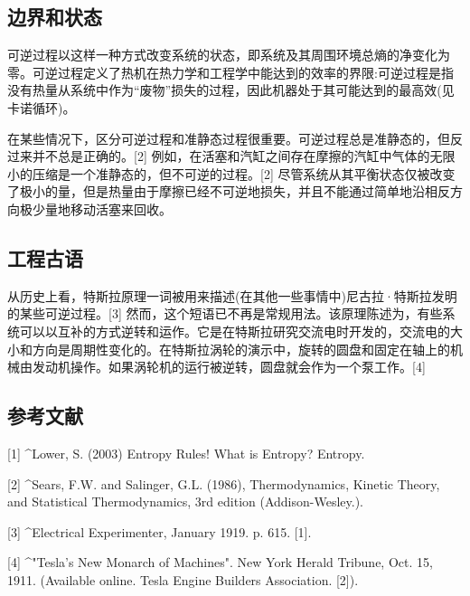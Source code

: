 \subsection{边界和状态}
可逆过程以这样一种方式改变系统的状态，即系统及其周围环境总熵的净变化为零。可逆过程定义了热机在热力学和工程学中能达到的效率的界限:可逆过程是指没有热量从系统中作为“废物”损失的过程，因此机器处于其可能达到的最高效(见卡诺循环)。

在某些情况下，区分可逆过程和准静态过程很重要。可逆过程总是准静态的，但反过来并不总是正确的。[2] 例如，在活塞和汽缸之间存在摩擦的汽缸中气体的无限小的压缩是一个准静态的，但不可逆的过程。[2] 尽管系统从其平衡状态仅被改变了极小的量，但是热量由于摩擦已经不可逆地损失，并且不能通过简单地沿相反方向极少量地移动活塞来回收。

\subsection{工程古语}
从历史上看，特斯拉原理一词被用来描述(在其他一些事情中)尼古拉·特斯拉发明的某些可逆过程。[3] 然而，这个短语已不再是常规用法。该原理陈述为，有些系统可以以互补的方式逆转和运作。它是在特斯拉研究交流电时开发的，交流电的大小和方向是周期性变化的。在特斯拉涡轮的演示中，旋转的圆盘和固定在轴上的机械由发动机操作。如果涡轮机的运行被逆转，圆盘就会作为一个泵工作。[4]

\subsection{参考文献}
[1]
^Lower, S. (2003) Entropy Rules! What is Entropy? Entropy.

[2]
^Sears, F.W. and Salinger, G.L. (1986), Thermodynamics, Kinetic Theory, and Statistical Thermodynamics, 3rd edition (Addison-Wesley.).

[3]
^Electrical Experimenter, January 1919. p. 615. [1].

[4]
^"Tesla's New Monarch of Machines". New York Herald Tribune, Oct. 15, 1911. (Available online. Tesla Engine Builders Association. [2]).